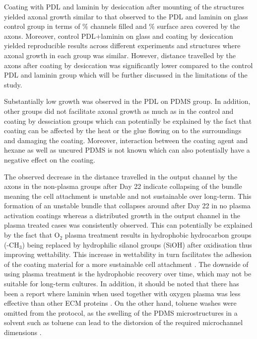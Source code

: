 \quad Coating with PDL and laminin by desiccation after mounting of the structures yielded axonal growth similar to that observed to the PDL and laminin on glass control group in terms of $\%$ channels filled and $\%$ surface area covered by the axons. Moreover, control PDL+laminin on glass and coating by desiccation yielded reproducible results across different experiments and structures where axonal growth in each group was similar. However, distance travelled by the axons after coating by desiccation was significantly lower compared to the control PDL and laminin group which will be further discussed in the limitations of the study.

\quad Substantially low growth was observed in the PDL on PDMS group. In addition, other groups did not facilitate axonal growth as much as in the control and coating by dessciation groups which can potentially be explained by the fact that coating can be affected by the heat or the glue flowing on to the surroundings and damaging the coating. Moreover, interaction between the coating agent and hexane as well as uncured PDMS is not known which can also potentially have a negative effect on the coating.

\quad The observed decrease in the distance travelled in the output channel by the axons in the non-plasma groups after Day 22 indicate collapsing of the bundle meaning the cell attachment is unstable and not sustainable over long-term. This formation of an unstable bundle that collapses around after Day 22 in no plasma activation coatings whereas a distributed growth in the output channel in the plasma treated cases was consistently observed. This can potentially be explained by the fact that O$_{2}$ plasma treatment results in hydrophobic hydrocarbon groups (-CH$_{3}$) being replaced by hydrophilic silanol groups (SiOH) after oxidisation thus improving wettability. This increase in wettability in turn facilitates the adhesion of the coating material for a more sustainable cell attachment \cite{akther2020surface}. The downside of using plasma treatment is the hydrophobic recovery over time, which may not be suitable for long-term cultures. In addition, it should be noted that there has been a report where laminin when used together with oxygen plasma was less effective than other ECM proteins \cite{akther2020surface}. On the other hand, toluene washes were omitted from the protocol, as the swelling of the PDMS microstructures in a solvent such as toluene can lead to the distorsion of the required  microchannel dimensions \cite{koh2012quantitative}.


